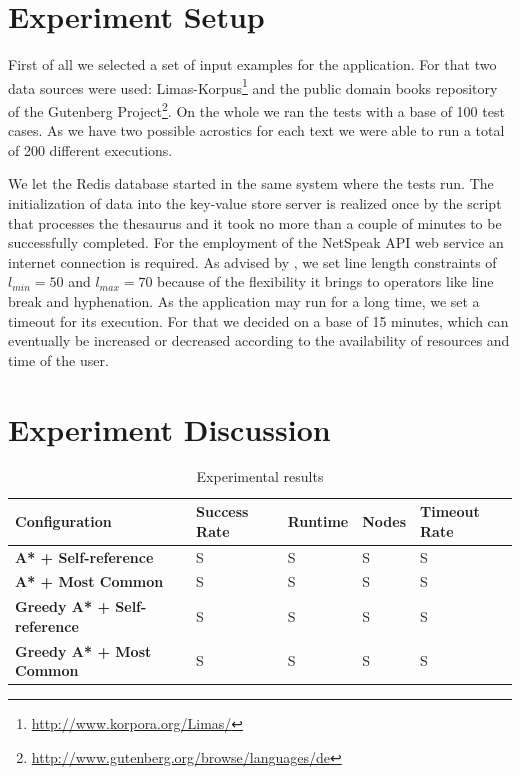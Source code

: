 \documentclass[11pt]{reportAlternative}
\begin{document}
\section{Experiment Setup}
First of all we selected a set of input examples for the application. For that two data sources were used: Limas-Korpus\footnote{\url{http://www.korpora.org/Limas/}} and the public domain books repository of the Gutenberg Project\footnote{\url{http://www.gutenberg.org/browse/languages/de}}. On the whole we ran the tests with a base of  100 test cases. As we have two possible acrostics for each text we were able to run a total of 200 different executions.

We let the Redis database started in the same system where the tests run. The initialization of data into the key-value store server is realized once by the script that processes the thesaurus and it took no more than a couple of minutes to be successfully completed. For the employment of the NetSpeak API web service an internet connection is required. As advised by \cite{Stein}, we set line length constraints of $l_{min} = 50$ and $l_{max} = 70$ because of the flexibility it brings to operators like line break and hyphenation. As the application may run for a long time, we set a timeout for its execution. For that we decided on a base of 15 minutes, which can eventually be increased or decreased according to the availability of resources and time of the user.

\section{Experiment Discussion}

\begin{table}
\centering
\begin{tabular}{l | l | l | l | l}
	\hline
	\textbf{Configuration} & \textbf{Success Rate} & \textbf{Runtime} & \textbf{Nodes} & \textbf{Timeout Rate} \\ \hline
		\textbf{A* + Self-reference}	& S	& S	& S	& S \\ \hline
		\textbf{A* + Most Common}		& S	& S	& S	& S \\ \hline
		\textbf{Greedy A* + Self-reference}	& S & S	& S	& S \\ \hline
		\textbf{Greedy A* + Most Common}	& S & S	& S	& S \\
	\hline
\end{tabular}
\label{tab:results}
\caption{Experimental results}
\end{table}
\end{document}
